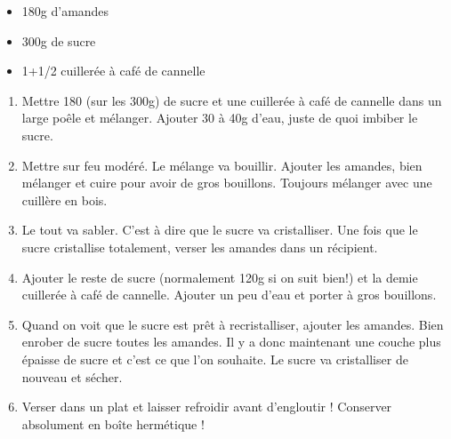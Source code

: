 \bigskip
{}
{}{\begin{itemize}
	\item 180g d'amandes
	\item 300g de sucre
	\item 1+1/2 cuillerée à café de cannelle
\end{itemize}}
{\begin{enumerate}
	\item Mettre 180 (sur les 300g) de sucre et une cuillerée à café de cannelle dans un large poêle et mélanger.  Ajouter 30 à 40g d'eau, juste de quoi imbiber le sucre. 
	\item Mettre sur feu modéré. Le mélange va bouillir. Ajouter les amandes, bien mélanger et cuire pour avoir de gros bouillons. Toujours mélanger avec une cuillère en bois.
	\item Le tout va sabler. C'est à dire que le sucre va cristalliser. Une fois que le sucre cristallise totalement, verser les amandes dans un récipient. 
	\item Ajouter le reste de sucre (normalement 120g si on suit bien!) et la demie cuillerée à café de cannelle.  Ajouter un peu d'eau et porter à gros bouillons.
	\item Quand on voit que le sucre est prêt  à recristalliser, ajouter les amandes. Bien enrober de sucre toutes les amandes. Il y a donc maintenant une couche plus épaisse de sucre et c'est ce que l'on souhaite. Le sucre va cristalliser de nouveau et sécher. 
	\item Verser dans un plat et laisser refroidir avant d'engloutir ! Conserver absolument en boîte hermétique !
\end{enumerate}}

